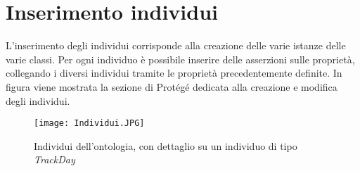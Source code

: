 \section{Inserimento individui}
L'inserimento degli individui corrisponde alla creazione delle varie istanze delle varie classi. Per ogni individuo è possibile inserire delle asserzioni sulle proprietà, collegando i diversi individui tramite le proprietà precedentemente definite. In figura viene mostrata la sezione di Protégé dedicata alla creazione e modifica degli individui.
\begin{figure}[h]
	\centering
	\texttt{[image: Individui.JPG]}
	\caption{Individui dell’ontologia, con dettaglio su un individuo di tipo \textit{TrackDay}}
\end{figure}
\clearpage